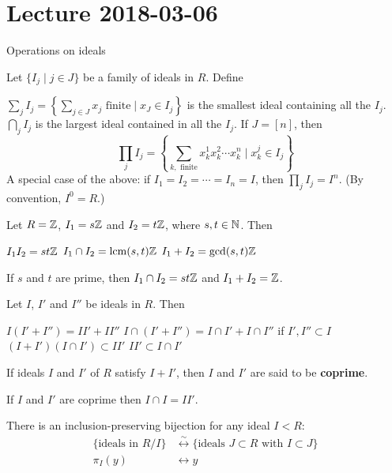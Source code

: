 \section{Lecture 2018-03-06}

Operations on ideals

\begin{defn}
	Let $\{I_j \mid j \in J\}$ be a family of ideals in $R$.
	Define
	\begin{itm}
		\io $\sum_j I_j = \left\{ \sum_{j \in J} x_j \text{ finite} \mid x_J \in I_j \right\}$ is the smallest ideal containing all the $I_j$.
		\io $\bigcap_j I_j$ is the largest ideal contained in all the $I_j$.
		\io If $J = [n]$, then
		\[\prod_j I_j = \left\{ \sum_{k,\text{ finite}} x_k^1 x_k^2 \cdots x_k^n \mid x_k^j \in I_j\right\}\]
		\io A special case of the above: if $I_1=I_2=\cdots=I_n=I$, then $\prod_j I_j = I^n$.
		(By convention, $I^0=R$.)
	\end{itm}
\end{defn}

\begin{exam}
	Let $R=\mathbb{Z}$, $I_1 = s\mathbb{Z}$ and $I_2 = t\mathbb{Z}$, where $s,t \in \mathbb{N}$.
	Then
	\begin{itm}
		\io $I_1 I_2 = st\mathbb{Z}$
		\io $I_1 \cap I_2 = \operatorname*{lcm}(s,t)\mathbb{Z}$
		\io $I_1+I_2 = \gcd(s,t)\mathbb{Z}$
	\end{itm}
	If $s$ and $t$ are prime, then $I_1 \cap I_2 = st\mathbb{Z}$ and $I_1+I_2=\mathbb{Z}$.
\end{exam}

\begin{prop}
	Let $I$, $I'$ and $I''$ be ideals in $R$.
	Then
	\begin{itm}
		\io $I(I'+I'') = II'+II''$
		\io $I \cap (I'+I'') = I \cap I' + I \cap I''$ if $I',I'' \subset I$
		\io $(I+I')(I \cap I') \subset II'$
		\io $II' \subset I \cap I'$
	\end{itm}
\end{prop}

\begin{defn}
	If ideals $I$ and $I'$ of $R$ satisfy $I+I'$, then $I$ and $I'$ are said to be \textbf{coprime}.
\end{defn}

\begin{prop}
	If $I$ and $I'$ are coprime then $I \cap I = II'$.
\end{prop}

\begin{prop}
	There is an inclusion-preserving bijection for any ideal $I<R$:
	\begin{align*}
		\{\text{ideals in } R/I\} &\overset{\sim}{\longleftrightarrow} \{\text{ideals } J \subset R \text{ with } I \subset J\} \\
		\pi_I(y) &\longleftrightarrow y
	\end{align*}
\end{prop}

